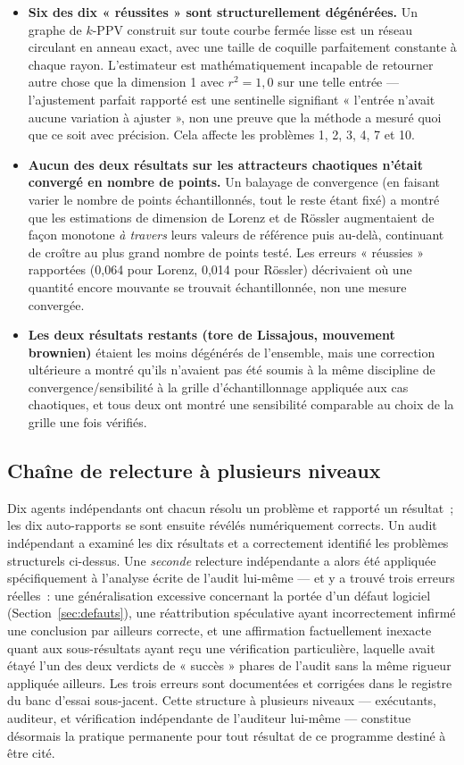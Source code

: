 \documentclass[11pt,a4paper]{article}
\begin{document}
\begin{itemize}
\item \textbf{Six des dix « réussites » sont structurellement dégénérées.}
  Un graphe de $k$-PPV construit sur toute courbe fermée lisse est un
  réseau circulant en anneau exact, avec une taille de coquille
  parfaitement constante à chaque rayon. L'estimateur est
  mathématiquement incapable de retourner autre chose que la dimension 1
  avec $r^2=1,0$ sur une telle entrée --- l'ajustement parfait rapporté
  est une sentinelle signifiant « l'entrée n'avait aucune variation à
  ajuster », non une preuve que la méthode a mesuré quoi que ce soit avec
  précision. Cela affecte les problèmes 1, 2, 3, 4, 7 et 10.
\item \textbf{Aucun des deux résultats sur les attracteurs chaotiques
  n'était convergé en nombre de points.} Un balayage de convergence (en
  faisant varier le nombre de points échantillonnés, tout le reste étant
  fixé) a montré que les estimations de dimension de Lorenz et de
  R\"ossler augmentaient de façon monotone \emph{à travers} leurs valeurs
  de référence puis au-delà, continuant de croître au plus grand nombre
  de points testé. Les erreurs « réussies » rapportées (0,064 pour
  Lorenz, 0,014 pour R\"ossler) décrivaient où une quantité encore
  mouvante se trouvait échantillonnée, non une mesure convergée.
\item \textbf{Les deux résultats restants (tore de Lissajous, mouvement
  brownien)} étaient les moins dégénérés de l'ensemble, mais une
  correction ultérieure a montré qu'ils n'avaient pas été soumis à la
  même discipline de convergence/sensibilité à la grille
  d'échantillonnage appliquée aux cas chaotiques, et tous deux ont montré
  une sensibilité comparable au choix de la grille une fois vérifiés.
\end{itemize}

\subsection{Chaîne de relecture à plusieurs niveaux}
\label{sec:chaine-audit}

Dix agents indépendants ont chacun résolu un problème et rapporté un
résultat~; les dix auto-rapports se sont ensuite révélés numériquement
corrects. Un audit indépendant a examiné les dix résultats et a
correctement identifié les problèmes structurels ci-dessus. Une
\emph{seconde} relecture indépendante a alors été appliquée
spécifiquement à l'analyse écrite de l'audit lui-même --- et y a trouvé
trois erreurs réelles~: une généralisation excessive concernant la portée
d'un défaut logiciel (Section~\ref{sec:defauts}), une réattribution
spéculative ayant incorrectement infirmé une conclusion par ailleurs
correcte, et une affirmation factuellement inexacte quant aux
sous-résultats ayant reçu une vérification particulière, laquelle avait
étayé l'un des deux verdicts de « succès » phares de l'audit sans la même
rigueur appliquée ailleurs. Les trois erreurs sont documentées et
corrigées dans le registre du banc d'essai sous-jacent. Cette structure à
plusieurs niveaux --- exécutants, auditeur, et vérification indépendante
de l'auditeur lui-même --- constitue désormais la pratique permanente pour
tout résultat de ce programme destiné à être cité.
\end{document}
